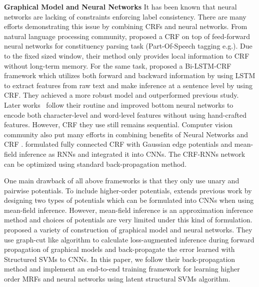 \documentclass[sigconf, anonymous, review]{acmart}
\renewcommand{\citename}{\citet}
\renewcommand{\cite}{\citep}
\begin{document}
\textbf{Graphical Model and Neural Networks} It has been known
that neural networks are lacking of constraints enforcing label
consistency. There are many efforts demonstrating this issue by
combining CRFs and neural networks. From natural language
processing community, \citename{collobert2011natural} proposed a
CRF on top of feed-forward neural networks for constituency
parsing task (Part-Of-Speech tagging e.g.). Due to the fixed
sized window, their method only provides local information to CRF
without long-term memory. For the same task,
\citename{huang2015bidirectional} proposed a Bi-LSTM-CRF
framework which utilizes both forward and backward information by
using LSTM to extract features from raw text and make inference
at a sentence level by using CRF. They achieved a more robust
model and outperformed previous study. Later
works~\cite{ma2016end,lample2016neural} follow their routine and
improved bottom neural networks to encode both character-level
and word-level features without using hand-crafted features.
However, CRF they use still remains sequential. Computer vision
community also put many efforts in combining benefits of Neural
Networks and CRF \cite{chen2018deeplab,zheng2015conditional}.
\citename{zheng2015conditional} formulated fully connected CRF
with Gaussian edge potentials and mean-field inference as RNNs
and integrated it into CNNs. The CRF-RNNs network can be
optimized using standard back-propagation method.

One main drawback of all above frameworks is that they only use
unary and pairwise potentials. To include higher-order
potentials, \citename{arnab2016higher} extends previous work by
designing two types of potentials which can be formulated into
CNNs when using mean-field inference. However, mean-field
inference is an approximation inference method and choices of
potentials are very limited under this kind of formulation.
\citename{witoonchart2017application} proposed a variety of
construction of graphical model and neural networks. They use
graph-cut like algorithm to calculate loss-augmented inference
during forward propagation of graphical models and back-propagate
the error learned with Structured SVMs \cite{Joachims:ML09} to
CNNs. In this paper, we follow their back-propagation method and
implement an end-to-end training framework for learning higher
order MRFs and neural networks using latent structural SVMs
\cite{yu2009learning} algorithm.
\end{document}
